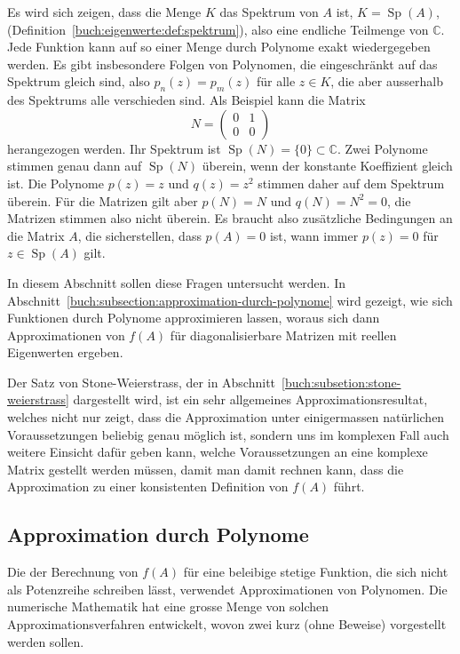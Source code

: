 Es wird sich zeigen, dass die Menge $K$ das Spektrum von $A$ ist,
$K=\operatorname{Sp}(A)$,
(Definition~\ref{buch:eigenwerte:def:spektrum}),
also eine endliche Teilmenge von $\mathbb{C}$.
Jede Funktion kann auf so einer Menge durch Polynome exakt wiedergegeben
werden.
Es gibt insbesondere Folgen von Polynomen, die eingeschränkt
auf das Spektrum gleich sind, also $p_n(z)=p_m(z)$ für alle $z\in K$,
die aber ausserhalb des Spektrums alle verschieden sind.
Als Beispiel kann die Matrix 
\[
N=\begin{pmatrix}0&1\\0&0\end{pmatrix}
\]
herangezogen werden.
Ihr Spektrum ist $\operatorname{Sp}(N)=\{0\}\subset\mathbb{C}$.
Zwei Polynome stimmen genau dann auf $\operatorname{Sp}(N)$ überein,
wenn der konstante Koeffizient gleich ist.
Die Polynome $p(z)=z$ und $q(z)=z^2$ stimmen daher auf dem Spektrum
überein.
Für die Matrizen gilt aber $p(N)=N$ und $q(N)=N^2=0$, die Matrizen
stimmen also nicht überein.
Es braucht also zusätzliche Bedingungen an die Matrix $A$, die
sicherstellen, dass $p(A)=0$ ist, wann immer $p(z)=0$ für
$z\in\operatorname{Sp}(A)$ gilt.

In diesem Abschnitt sollen diese Fragen untersucht werden.
In Abschnitt~\ref{buch:subsection:approximation-durch-polynome}
wird gezeigt, wie sich Funktionen durch Polynome approximieren
lassen, woraus sich dann Approximationen von $f(A)$ für diagonalisierbare
Matrizen mit reellen Eigenwerten ergeben.

Der Satz von Stone-Weierstrass, der in
%
%
Abschnitt~\ref{buch:subsetion:stone-weierstrass} dargestellt wird,
ist ein sehr allgemeines Approximationsresultat, welches nicht nur
zeigt, dass die Approximation unter einigermassen natürlichen Voraussetzungen
beliebig genau möglich ist, sondern uns im komplexen Fall auch
weitere Einsicht dafür geben kann, welche Voraussetzungen an eine
komplexe Matrix gestellt werden müssen, damit man damit rechnen kann,
dass die Approximation zu einer konsistenten Definition von $f(A)$ führt.

%
%
\subsection{Approximation durch Polynome
\label{buch:subsection:approximation-durch-polynome}}
Die der Berechnung von $f(A)$ für eine beleibige stetige Funktion,
die sich nicht als Potenzreihe schreiben lässt, verwendet Approximationen
von Polynomen.
Die numerische Mathematik hat eine grosse Menge von solchen
Approximationsverfahren entwickelt, wovon zwei kurz (ohne Beweise)
vorgestellt werden sollen.

